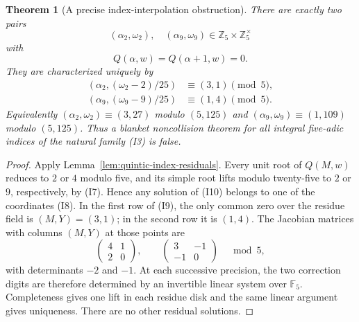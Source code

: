 \documentclass[11pt]{article}
\newtheorem{theorem}{Theorem}
\newcommand{\ZZ}{\mathbb Z}
\begin{document}
\begin{theorem}[A precise index-interpolation obstruction]\label{thm:quintic-five-adic-index-obstruction}
There are exactly two pairs
\[
 (\alpha_2,\omega_2),\quad(\alpha_9,\omega_9)
              \in\ZZ_5\times\ZZ_5^\times
\]
with
\[
                    Q(\alpha,w)=Q(\alpha+1,w)=0.                  \tag{I10}
\]
They are characterized uniquely by
\[
 \begin{split}
 (\alpha_2,(\omega_2-2)/25)&\equiv(3,1)\pmod5,\\
 (\alpha_9,(\omega_9-9)/25)&\equiv(1,4)\pmod5 .
 \end{split}                                                      \tag{I11}
\]
Equivalently $(\alpha_2,\omega_2)\equiv(3,27)$ modulo $(5,125)$
and $(\alpha_9,\omega_9)\equiv(1,109)$ modulo $(5,125)$.
Thus a blanket noncollision theorem for all integral five-adic
indices of the natural family (I3) is false.
\end{theorem}
\begin{proof}
Apply Lemma~\ref{lem:quintic-index-residuals}.
Every unit root of $Q(M,w)$ reduces to $2$ or $4$ modulo five,
and its simple root lifts modulo twenty-five to $2$ or $9$,
respectively, by (I7).  Hence any solution of (I10) belongs to
one of the coordinates (I8).
In the first row of (I9), the only common zero over the residue
field is $(M,Y)=(3,1)$; in the second row it is $(1,4)$.
The Jacobian matrices with columns $(M,Y)$ at those points are
\[
 \begin{pmatrix}4&1\\2&0\end{pmatrix},
 \qquad
 \begin{pmatrix}3&-1\\-1&0\end{pmatrix}\quad\bmod5 ,
\]
with determinants $-2$ and $-1$.
At each successive precision, the two correction digits are
therefore determined by an invertible linear system over $\mathbb F_5$.
Completeness gives one lift in each residue disk and the same
linear argument gives uniqueness.  There are no other residual
solutions.
\end{proof}
\end{document}
